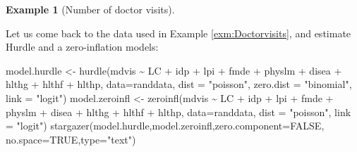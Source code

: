 \documentclass[
  12pt,
]{book}
\newenvironment{Shaded}{\begin{snugshade}}{\end{snugshade}}
\newcommand{\AttributeTok}[1]{\textcolor[rgb]{0.77,0.63,0.00}{#1}}
\newcommand{\ConstantTok}[1]{\textcolor[rgb]{0.00,0.00,0.00}{#1}}
\newcommand{\FunctionTok}[1]{\textcolor[rgb]{0.00,0.00,0.00}{#1}}
\newcommand{\NormalTok}[1]{#1}
\newcommand{\OtherTok}[1]{\textcolor[rgb]{0.56,0.35,0.01}{#1}}
\newcommand{\SpecialCharTok}[1]{\textcolor[rgb]{0.00,0.00,0.00}{#1}}
\newcommand{\StringTok}[1]{\textcolor[rgb]{0.31,0.60,0.02}{#1}}
\theoremstyle{definition}
\theoremstyle{definition}
\newtheorem{example}{Example}[chapter]
\theoremstyle{definition}
\theoremstyle{definition}
\theoremstyle{remark}
\begin{document}
\begin{example}[Number of doctor visits]
\protect\hypertarget{exm:Doctorvisits2}{}\label{exm:Doctorvisits2}

Let us come back to the data used in Example \ref{exm:Doctorvisits}, and estimate Hurdle and a zero-inflation models:

\begin{Shaded}
\begin{Highlighting}[]
\NormalTok{model.hurdle }\OtherTok{\textless{}{-}} 
  \FunctionTok{hurdle}\NormalTok{(mdvis }\SpecialCharTok{\textasciitilde{}}\NormalTok{ LC }\SpecialCharTok{+}\NormalTok{ idp }\SpecialCharTok{+}\NormalTok{ lpi }\SpecialCharTok{+}\NormalTok{ fmde }\SpecialCharTok{+}\NormalTok{ physlm }\SpecialCharTok{+}\NormalTok{ disea }\SpecialCharTok{+}\NormalTok{ hlthg }\SpecialCharTok{+}\NormalTok{ hlthf }\SpecialCharTok{+} 
\NormalTok{           hlthp, }\AttributeTok{data=}\NormalTok{randdata,}
         \AttributeTok{dist =} \StringTok{"poisson"}\NormalTok{, }\AttributeTok{zero.dist =} \StringTok{"binomial"}\NormalTok{, }\AttributeTok{link =} \StringTok{"logit"}\NormalTok{)}
\NormalTok{model.zeroinfl }\OtherTok{\textless{}{-}} \FunctionTok{zeroinfl}\NormalTok{(mdvis }\SpecialCharTok{\textasciitilde{}}\NormalTok{ LC }\SpecialCharTok{+}\NormalTok{ idp }\SpecialCharTok{+}\NormalTok{ lpi }\SpecialCharTok{+}\NormalTok{ fmde }\SpecialCharTok{+}\NormalTok{ physlm }\SpecialCharTok{+}
\NormalTok{                             disea }\SpecialCharTok{+}\NormalTok{ hlthg }\SpecialCharTok{+}\NormalTok{ hlthf }\SpecialCharTok{+}\NormalTok{ hlthp, }\AttributeTok{data=}\NormalTok{randdata,}
                           \AttributeTok{dist =} \StringTok{"poisson"}\NormalTok{, }\AttributeTok{link =} \StringTok{"logit"}\NormalTok{)}
\FunctionTok{stargazer}\NormalTok{(model.hurdle,model.zeroinfl,}\AttributeTok{zero.component=}\ConstantTok{FALSE}\NormalTok{,}
          \AttributeTok{no.space=}\ConstantTok{TRUE}\NormalTok{,}\AttributeTok{type=}\StringTok{"text"}\NormalTok{)}
\end{Highlighting}
\end{Shaded}


\end{example}
\end{document}

